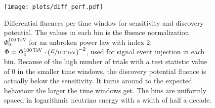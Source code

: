 \begin{figure}[htbp]
  \centering
  \texttt{[image: plots/diff\_perf.pdf]}
  \caption[Time-dependent differential performances]{
    Differential fluences per time window for sensitivity and discovery potential.
    The values in each bin is the fluence normalization $\Phi_0^{\SI{100}{\TeV}}$ for an unbroken power law with index $2$, $\Phi = \Phi_0^{\SI{100}{\TeV}}\cdot \left(\sfrac{E}{\SI{100}{\TeV}}\right)^{-2}$, used for signal event injection in each bin.
    Because of the high number of trials with a test statistic value of $0$ in the smaller time windows, the discovery potential fluence is actually below the sensitivity.
    It turns around to the expected behaviour the larger the time windows get.
    The bins are uniformly spaced in logarithmic neutrino energy with a width of half a decade.
  }
  \label{fig:tdep_diff_perf}
\end{figure}

